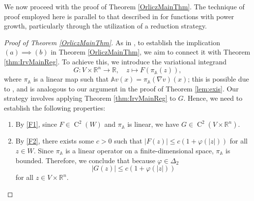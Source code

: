 \documentclass[a4paper,11pt]{amsart}
\numberwithin{equation}{section}
\newcommand{\R}{\mathbb{R}}
\newcommand{\hold}{\operatorname{C}}
\begin{document}
	We now proceed with the proof of Theorem \ref{OrliczMainThm}. The  technique of proof employed here is parallel to that described in \cite{contiFXG} for functions with power growth, particularly through the utilization of a reduction strategy.
	\begin{proof}[Proof of Theorem \ref{OrliczMainThm}]
		As in \cite{contiFXG}, to establish the implication $(a)\!\implies\!(b)$ in Theorem \ref{OrliczMainThm}, we aim to connect it with Theorem \ref{thm:IrvMainReg}. To achieve this, we introduce the variational integrand
		\begin{equation}
			G: V \times \mathbb{R}^n \to \R, \quad z \mapsto F(\pi_{\mathbb{A}}(z)), \label{eq:G}
		\end{equation}
		where $\pi_\mathbb{A}$ is a linear map such that $\mathbb{A}v(x) = \pi_\mathbb{A}(\nabla v)(x)$; this is possible due to \cite[Section 3]{contiFXG}, and is analogous to our argument in the proof of Theorem \ref{lem:exis}. Our strategy involves applying Theorem \ref{thm:IrvMainReg} to $G$. Hence, we need to establish the following properties:
		\begin{enumerate}
			\item By \ref{F1}, since $F \in \hold^2(W)$ and $\pi_{\mathbb{A}}$ is linear, we have $G \in \hold^2(V \times \mathbb{R}^n)$.
			\item By \ref{F2}, there exists some $c > 0$ such that $|F(z)| \leq c(1+\varphi(|z|))$ for all $z \in W$. Since $\pi_\mathbb{A}$ is a linear operator on a finite-dimensional space, $\pi_\mathbb{A}$ is bounded. Therefore, we conclude that because $\varphi \in \Delta_2$
			\[
			|G(z)| \leq c(1+\varphi(|z|))
			\]
			for all $z \in V \times \mathbb{R}^n$.
			

\end{enumerate}
\end{proof}
\end{document}
